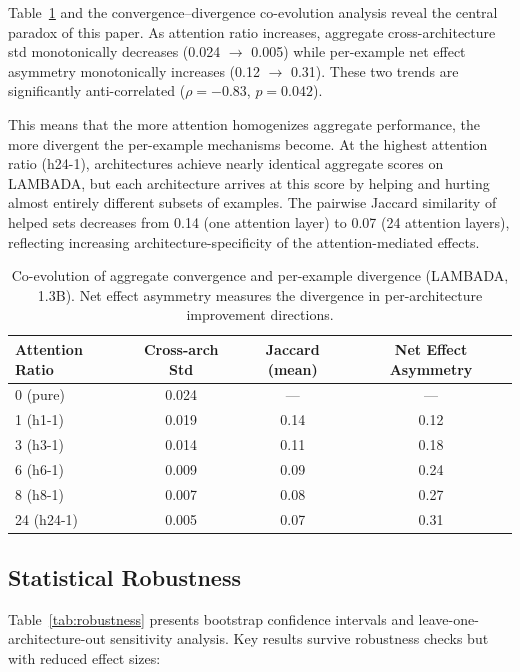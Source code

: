 \documentclass[11pt,a4paper]{article}
\begin{document}
Table~\ref{tab:coevolution} and the convergence--divergence co-evolution analysis reveal the central paradox of this paper. As attention ratio increases, aggregate cross-architecture std monotonically decreases (0.024 $\to$ 0.005) while per-example net effect asymmetry monotonically increases (0.12 $\to$ 0.31). These two trends are significantly anti-correlated ($\rho{=}{-}0.83$, $p{=}0.042$).

This means that the more attention homogenizes aggregate performance, the more divergent the per-example mechanisms become. At the highest attention ratio (h24-1), architectures achieve nearly identical aggregate scores on LAMBADA, but each architecture arrives at this score by helping and hurting almost entirely different subsets of examples. The pairwise Jaccard similarity of helped sets decreases from 0.14 (one attention layer) to 0.07 (24 attention layers), reflecting increasing architecture-specificity of the attention-mediated effects.

\begin{table}[t]
\centering
\small
\caption{Co-evolution of aggregate convergence and per-example divergence (LAMBADA, 1.3B). Net effect asymmetry measures the divergence in per-architecture improvement directions.}
\label{tab:coevolution}
\begin{tabular}{@{}lccc@{}}
\toprule
Attention Ratio & Cross-arch Std & Jaccard (mean) & Net Effect Asymmetry \\
\midrule
0 (pure) & 0.024 & --- & --- \\
1 (h1-1) & 0.019 & 0.14 & 0.12 \\
3 (h3-1) & 0.014 & 0.11 & 0.18 \\
6 (h6-1) & 0.009 & 0.09 & 0.24 \\
8 (h8-1) & 0.007 & 0.08 & 0.27 \\
24 (h24-1) & 0.005 & 0.07 & 0.31 \\
\bottomrule
\end{tabular}
\end{table}

\subsection{Statistical Robustness}
\label{sec:robustness}

Table~\ref{tab:robustness} presents bootstrap confidence intervals and leave-one-architecture-out sensitivity analysis. Key results survive robustness checks but with reduced effect sizes:
\end{document}
